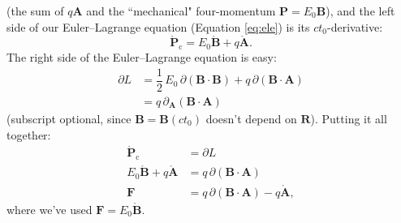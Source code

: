 \documentclass[12pt]{article}
\renewcommand{\vv}[1]{\mathbf{#1}}
\begin{document}
(the sum of $q \vv A$ and the ``mechanical" four-momentum $\vv P = E_0 \vv B$), and the left side of our Euler--Lagrange equation (Equation \ref{eq:ele}) is its $ct_0$-derivative:
\begin{equation*}
\mathring{\vv P}_\textrm{c}  =  E_0 \mathring{\vv B} + q \mathring{\vv A} .
\end{equation*}
The right side of the Euler--Lagrange equation is easy:
\begin{equation*}
\begin{split}
\partialup L &= \dfrac{1}{2} \, E_0 \, \partialup (\vv B \cdot \vv B) + q \, \partialup (\vv B \cdot \vv A) \\[2pt]
&= q \, \partialup_{\vv A} (\vv B \cdot \vv A)
\end{split}
\end{equation*}
(subscript optional, since $\vv B = \vv B(ct_0)$ doesn't depend on $\vv R$). Putting it all together:
\begin{equation*}
\begin{split}
\mathring{\vv P}_\textrm{c} &= \partialup L \\[2pt]
E_0 \mathring{\vv B} + q \mathring{\vv A} &= q \, \partialup (\vv B \cdot \vv A) \\[3pt]
\vv F &= q \, \partialup (\vv B \cdot \vv A) - q \mathring{\vv A} ,
\end{split}
\end{equation*}
where we've used $\vv F = E_0 \mathring{\vv B}$.
\end{document}
